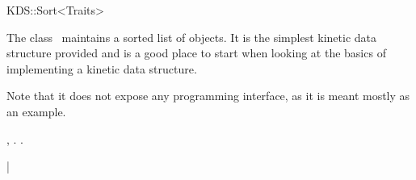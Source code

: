 

\begin{ccRefClass}{KDS::Sort<Traits>}  %


\ccDefinition
  
The class \ccRefName\ maintains a sorted list of objects. It is the
simplest kinetic data structure provided and is a good place to start
when looking at the basics of implementing a kinetic data
structure. 

Note that it does not expose any programming interface, as it is meant
mostly as an example.


\ccCreation
{}  %


\ccSeeAlso

,
.
.

\ccExample


| 


\end{ccRefClass}


